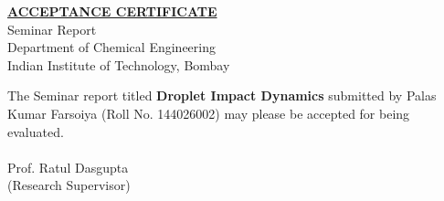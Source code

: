 \begin{center}
\underline{\textbf{\large ACCEPTANCE CERTIFICATE}} \\[1cm]
Seminar Report \\[0.2cm]
Department of Chemical Engineering \\
Indian Institute of Technology, Bombay \\[7.5mm]
\end{center}
The Seminar report titled \textbf{Droplet Impact Dynamics} submitted by Palas Kumar Farsoiya (Roll No. 144026002) may please be accepted for being evaluated.\\[1cm]
\underline{\hspace{4cm}}\\
Prof. Ratul Dasgupta\\
(Research Supervisor)
